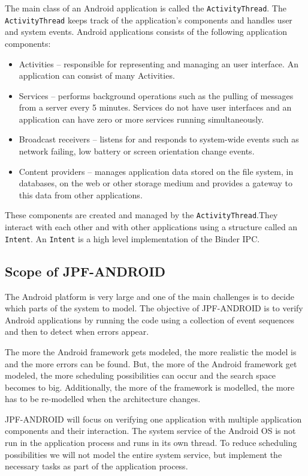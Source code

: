 \documentclass{acm_proc_article-sp}
\begin{document}
The main class of an Android application is called the \texttt{ActivityThread}. The \texttt{ActivityThread} keeps track of the
application's components and handles user and system events. Android applications consists of the
following application components:
\begin{itemize}
\item Activities -- responsible for representing and managing an user interface. An application can consist of many
Activities.
\item Services -- performs background operations such as the pulling of messages from a server every 5 minutes. Services do not have user
interfaces and an application can have zero or more services running simultaneously.
\item Broadcast receivers -- listens for and responds to system-wide events such as network failing, low battery or screen orientation
change events.
\item Content providers -- manages application data stored on the file system, in databases, on the web or other storage medium and provides
a gateway to this data from other applications.
\end{itemize}

These components are created and managed by the \texttt{ActivityThread}.They interact with each other and with other
applications using a structure called an \texttt{Intent}. An \texttt{Intent} is a high level implementation of the Binder IPC.

\subsection{Scope of JPF-ANDROID}
The Android platform is very large and one of the main challenges is to decide which parts of the system to model. The objective of
JPF-ANDROID is to verify Android applications by running the code using a collection of event sequences and then to detect when errors appear.

The more the Android framework gets modeled, the more realistic the model is and the more errors can be found. But, the more of the Android framework
get modeled, the more scheduling possibilities can occur and the search space becomes to big. Additionally, the more of the framework is modelled, 
the more has to be re-modelled when the architecture changes.

JPF-ANDROID will focus on verifying one application with multiple application components and their interaction. The system service of the Android OS
is not run in the application process and runs in its own thread. To reduce scheduling possibilities we will not model the entire system service,
but implement the necessary tasks as part of the application process.
\end{document}
